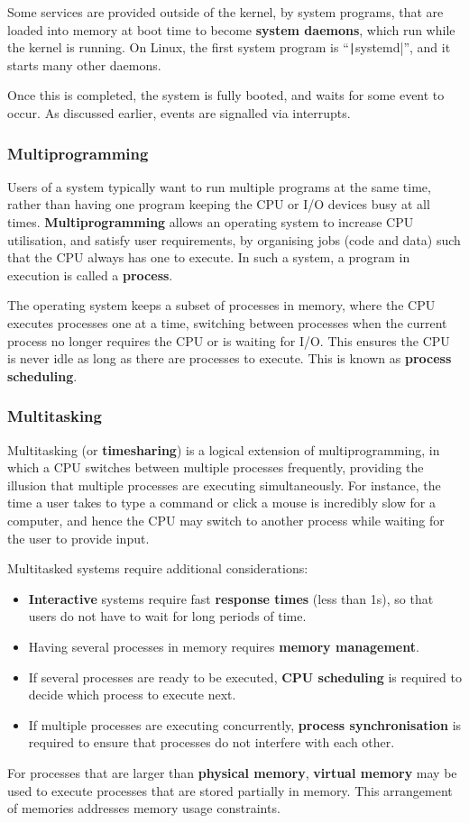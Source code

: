 \documentclass{article}
\begin{document}
Some services are provided outside of the kernel, by system programs,
that are loaded into memory at boot time to become \textbf{system
daemons}, which run while the kernel is running. On Linux, the first
system program is ``\texttt|systemd|'', and it starts many
other daemons.

Once this is completed, the system is fully booted, and waits for some
event to occur. As discussed earlier, events are signalled via
interrupts.
\subsubsection{Multiprogramming}
Users of a system typically want to run multiple programs at the same
time, rather than having one program keeping the CPU or I/O devices
busy at all times. \textbf{Multiprogramming} allows an operating system
to increase CPU utilisation, and satisfy user requirements, by
organising jobs (code and data) such that the CPU always has one to
execute. In such a system, a program in execution is called a
\textbf{process}.

The operating system keeps a subset of processes in memory, where the
CPU executes processes one at a time, switching between processes when
the current process no longer requires the CPU or is waiting for I/O.
This ensures the CPU is never idle as long as there are processes to
execute. This is known as \textbf{process scheduling}.
\subsubsection{Multitasking}
Multitasking (or \textbf{timesharing}) is a logical extension of
multiprogramming, in which a CPU switches between multiple processes
frequently, providing the illusion that multiple processes are
executing simultaneously. For instance, the time a user takes to type a
command or click a mouse is incredibly slow for a computer, and hence
the CPU may switch to another process while waiting for the user to
provide input.

Multitasked systems require additional considerations:
\begin{itemize}
    \item \textbf{Interactive} systems require fast
          \textbf{response times} (less than 1s), so that
          users do not have to wait for long periods of time.
    \item Having several processes in memory requires \textbf{memory
          management}.
    \item If several processes are ready to be executed, \textbf{CPU
          scheduling} is required to decide which process to execute
          next.
    \item If multiple processes are executing concurrently,
          \textbf{process synchronisation} is required to ensure that
          processes do not interfere with each other.
\end{itemize}
For processes that are larger than \textbf{physical memory},
\textbf{virtual memory} may be used to execute processes that are
stored partially in memory.
This arrangement of memories addresses memory usage constraints.
\end{document}
